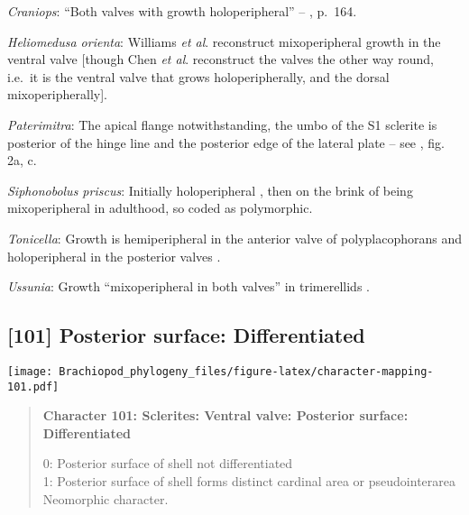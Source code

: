 \documentclass[openany]{book}
\theoremstyle{definition}
\theoremstyle{definition}
\theoremstyle{definition}
\theoremstyle{remark}
\begin{document}
\hypertarget{Craniops-coding-100}{}
\emph{Craniops}: ``Both valves with growth holoperipheral'' --
\citet{Williams2000LinguliformeaCraniiformea}, p.~164.

\hypertarget{Heliomedusa_orienta-coding-100}{}
\emph{Heliomedusa orienta}: Williams \emph{et al}.
\citeyearpar[2007]{Williams2000LinguliformeaCraniiformea} reconstruct
mixoperipheral growth in the ventral valve {[}though Chen \emph{et al}.
\citeyearpar{Chen2007Reinterpretationof} reconstruct the valves the
other way round, i.e.~it is the ventral valve that grows
holoperipherally, and the dorsal mixoperipherally{]}.

\hypertarget{Paterimitra-coding-100}{}
\emph{Paterimitra}: The apical flange notwithstanding, the umbo of the
S1 sclerite is posterior of the hinge line and the posterior edge of the
lateral plate -- see \citet{Larsson2014iPaterimitra}, fig. 2a, c.

\hypertarget{Siphonobolus_priscus-coding-100}{}
\emph{Siphonobolus priscus}: Initially holoperipheral
\citep[p.~159]{Popov2009Earlyontogeny}, then on the brink of being
mixoperipheral in adulthood, so coded as polymorphic.

\hypertarget{Tonicella-coding-100}{}
\emph{Tonicella}: Growth is hemiperipheral in the anterior valve of
polyplacophorans and holoperipheral in the posterior valves
\citep{Schwabe2010, Connors2012}.

\hypertarget{Ussunia-coding-100}{}
\emph{Ussunia}: Growth ``mixoperipheral in both valves'' in trimerellids
\citep{Williams2000LinguliformeaCraniiformea, Popov1997}.

\subsection*{{[}101{]} Posterior surface:
Differentiated}\label{posterior-surface-differentiated-1}

\texttt{[image: Brachiopod\_phylogeny\_files/figure-latex/character-mapping-101.pdf]}

\begin{quote}
\textbf{Character 101: Sclerites: Ventral valve: Posterior surface:
Differentiated}

0: Posterior surface of shell not differentiated\\
1: Posterior surface of shell forms distinct cardinal area or
pseudointerarea\\
Neomorphic character.
\end{quote}
\end{document}
